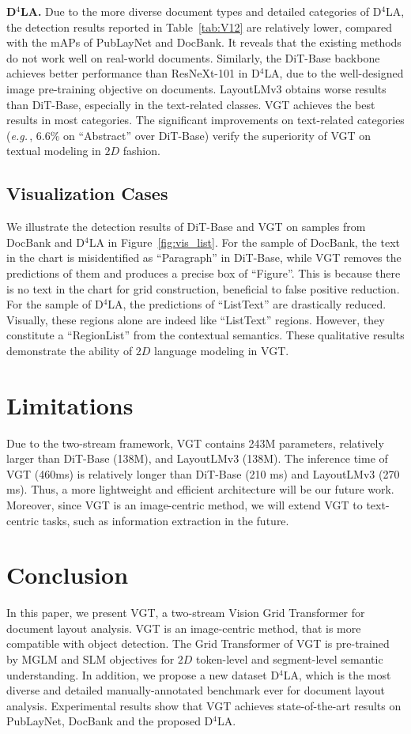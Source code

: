 \documentclass[10pt,twocolumn,letterpaper]{article}
\def\eg{\emph{e.g.}\,}
\begin{document}
\noindent
\textbf{D$^4$LA.} 
Due to the more diverse document types and detailed categories of D$^4$LA,
the detection results reported in Table~\ref{tab:V12} are relatively lower, compared with the mAPs of PubLayNet and DocBank.
It reveals that the existing methods do not work well on real-world documents.
Similarly, the DiT-Base backbone achieves better performance than ResNeXt-101 in D$^4$LA,
due to the well-designed image pre-training objective on documents.
LayoutLMv3 obtains worse results than DiT-Base, especially in the text-related classes.
VGT achieves the best results in most categories. 
The significant improvements on text-related categories (\eg, $6.6\%$ on ``Abstract'' over DiT-Base)
verify the superiority of VGT on textual modeling in $2D$ fashion.


\subsection{Visualization Cases}
We illustrate the detection results of DiT-Base and VGT on samples from DocBank and  D$^4$LA in Figure~\ref{fig:vis_list}. For the sample of DocBank, the text in the chart is misidentified as ``Paragraph'' in DiT-Base, while VGT removes the predictions of them and produces a precise box of ``Figure''.
This is because there is no text in the chart for grid construction, beneficial to false positive reduction. For the sample of D$^4$LA, the predictions of ``ListText'' are drastically reduced.
Visually, these regions alone are indeed like ``ListText'' regions.
However, they constitute a ``RegionList'' from the contextual semantics.
These qualitative results demonstrate the ability of $2D$ language modeling in VGT.

\section{Limitations}
Due to the two-stream framework, VGT contains 243M parameters, 
relatively larger than DiT-Base (138M), and LayoutLMv3 (138M).
The inference time of VGT (460ms) is relatively longer than DiT-Base (210 ms) and LayoutLMv3 (270 ms).
Thus, a more lightweight and efficient architecture will be our future work.
Moreover, since VGT is an image-centric method, we will extend VGT to text-centric tasks, such as information extraction in the future.


\section{Conclusion}
In this paper, we present VGT, a two-stream Vision Grid Transformer for document layout analysis.
VGT is an image-centric method, that is more compatible with object detection.
The Grid Transformer of VGT is pre-trained by MGLM and SLM objectives
for $2D$ token-level and segment-level semantic understanding.
In addition, we propose a new dataset D$^4$LA, which is the most diverse and detailed manually-annotated benchmark ever for document layout analysis.
Experimental results show that VGT achieves state-of-the-art results on PubLayNet, DocBank and the proposed D$^4$LA.
\end{document}
